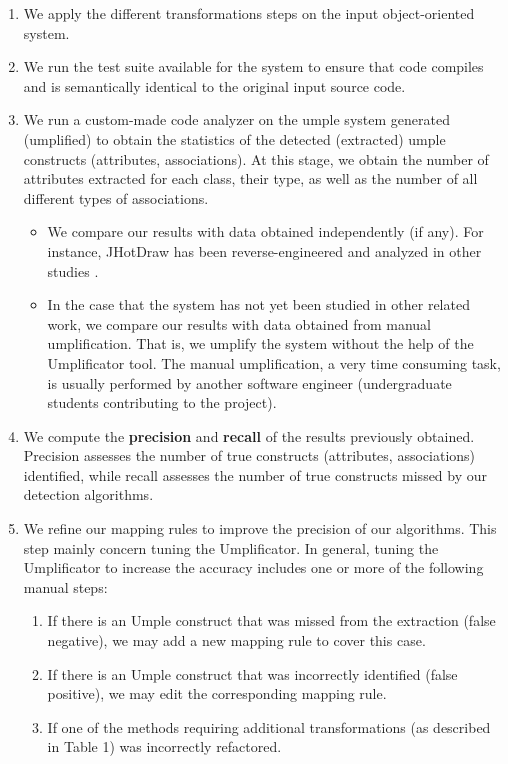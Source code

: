 \begin{enumerate}
\item We apply the different transformations steps on the input object-oriented system.
\item We run the test suite available for the system to ensure that code compiles and is semantically identical to the original input source code.
\item We run a custom-made code analyzer on the umple system generated (umplified) to obtain the statistics of the detected (extracted) umple constructs (attributes, associations). At this stage, we obtain the number of attributes extracted for each class, their type, as well as the number of all different types of associations.	

	\begin{itemize}
		\item We compare our results with data obtained independently (if any). For instance, JHotDraw has been reverse-engineered and analyzed in other studies \cite{Gueheneuc}. 
		
		\item In the case that the system has not yet been studied in other related work, we 				compare our results with data obtained from manual umplification. That is, we umplify the system without the help of the Umplificator tool. The manual 	umplification, a very time consuming task, is usually performed by another software engineer (undergraduate 			students contributing to the project).
	\end{itemize}
	
\item We compute the \textbf{precision} and \textbf{recall} of the results previously obtained. Precision assesses the number of true constructs (attributes, associations) identified, while recall assesses the number of true constructs missed by our detection algorithms. 

\item We refine our mapping rules to improve the precision of our algorithms. This step mainly concern  tuning the Umplificator. In general, tuning the Umplificator to increase the accuracy includes one or more of the following manual steps:

	\begin{enumerate}
		\item If there is an Umple construct that was missed from the extraction (false negative), we may add a new mapping 			rule to cover this case.
		
		\item If there is an Umple construct that was incorrectly identified (false positive), we may edit the corresponding 			mapping rule.
		
		\item If one of the methods requiring additional transformations (as described in Table 1) was incorrectly refactored.
		
	\end{enumerate}
\end{enumerate}

